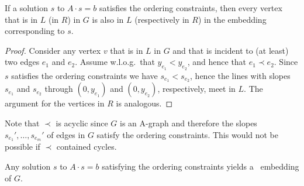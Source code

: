 \begin{obs}
If a solution $s$ to $A\cdot s=b$ satisfies the ordering constraints, then every vertex that is in $L$ (in $R$) in $G$ is also in $L$ (respectively in $R$) in the embedding corresponding to $s$. 
\end{obs}

\begin{proof}	  
Consider any vertex $v$ that is in $L$ in $G$ and that is incident to (at least) two edges $e_1$ and $e_2$. Assume w.l.o.g.\ that $y_{e_1} < y_{e_2}$, and hence that $e_1 \prec e_2$. Since $s$ satisfies the ordering constraints we have $s_{e_1} < s_{e_2}$, hence the lines with slopes $s_{e_1}$ and $s_{e_2}$ through $(0,y_{e_1})$ and $(0,y_{e_2})$, respectively, meet in $L$. The argument for the vertices in $R$ is analogous. 
\end{proof}	  

Note that $\prec$ is acyclic since $G$ is an A-graph and therefore the slopes $s_{e_1}',\ldots,s_{e_m}'$ of edges
in $G$ satisfy the ordering constraints.  This would not be possible if $\prec$ contained cycles. 

\begin{lem}
	Any solution $s$ to $A\cdot s=b$ satisfying
	the ordering constraints %
	yields a
	\Fary\ embedding of $G$.
\end{lem}

